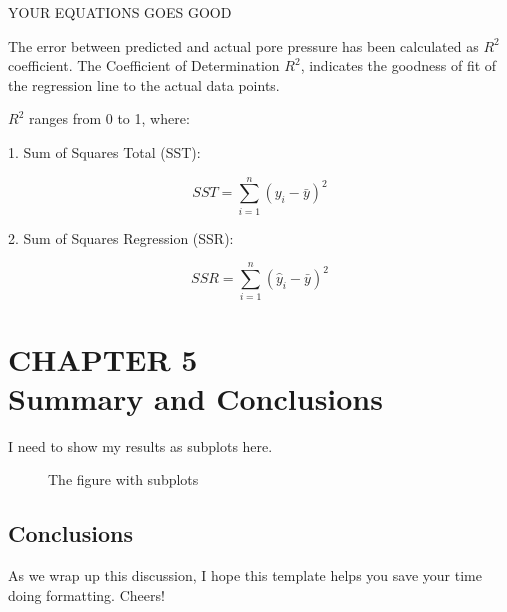 \documentclass[12pt]{article}
\begin{document}
YOUR EQUATIONS GOES GOOD

The error between predicted and actual pore pressure has been calculated as \( R^2 \) coefficient. The Coefficient of Determination  \( R^2 \), indicates the goodness of fit of the regression line to the actual data points.

 \( R^2 \) ranges from 0 to 1, where:
 

1. Sum of Squares Total (SST):

   \[ SST = \sum_{i=1}^{n} (y_i - \bar{y})^2 \]

2. Sum of Squares Regression (SSR):

   \[ SSR = \sum_{i=1}^{n} (\hat{y}_i - \bar{y})^2 \]

\newpage
\section*{CHAPTER 5\\Summary and Conclusions}

I need to show my results as subplots here.

\begin{figure}[H]
    \centering
    \hfill
    \caption{The figure with subplots}
    \label{fig:two_plots}
\end{figure}


\newpage
\subsection*{Conclusions}
As we wrap up this discussion, I hope this template helps you save your time doing formatting. Cheers!


\newpage


\end{document}
